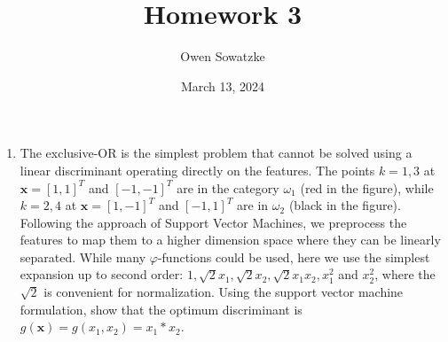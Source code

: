 \documentclass[fleqn]{article}
\title{Homework 3}
\author{Owen Sowatzke}
\date{March 13, 2024}
\newcommand{\zerodisplayskip}{
	\setlength{\abovedisplayskip}{0pt}%
	\setlength{\belowdisplayskip}{0pt}%
	\setlength{\abovedisplayshortskip}{0pt}%
	\setlength{\belowdisplayshortskip}{0pt}%
	\setlength{\mathindent}{0pt}}
\begin{document}
	\offinterlineskip
	\setlength{\lineskip}{12pt}
	\zerodisplayskip
	\maketitle
	
	\begin{enumerate}
		\item The exclusive-OR is the simplest problem that cannot be solved using a linear discriminant operating directly on the features. The points $k=1,3$ at $\mathbf{x} = [1,1]^T$ and $[-1,-1]^T$ are in the category $\omega_1$ (red in the figure), while $k=2,4$ at $\mathbf{x}=[1,-1]^T$ and $[-1,1]^T$ are in $\omega_2$ (black in the figure). Following the approach of Support Vector Machines, we preprocess the features to map them to a higher dimension space where they can be linearly separated. While many $\varphi$-functions could be used, here we use the simplest expansion up to second order: $1, \sqrt{2}x_1, \sqrt{2}x_2, \sqrt{2}x_1x_2, x_1^2$ and $x_2^2$, where the $\sqrt{2}$ is convenient for normalization. Using the support vector machine formulation, show that the optimum discriminant is $g(\mathbf{x}) = g(x_1,x_2) = x_1 * x_2$.
	\end{enumerate}
\end{document}
